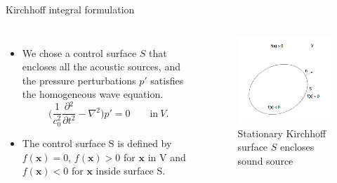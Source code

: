 \documentclass[10pt, aspectratio=169]{beamer}
\begin{document}
\begin{frame}{Kirchhoff integral formulation}
	\begin{columns}
		\begin{itemize}
			\item We chose a control surface $S$ that encloses all the acoustic sources, and the pressure perturbations $p'$ satisfies the homogeneous wave equation.
			\begin{equation}\label{Wave equation}
				\Bigg( \frac{1}{c_{0}^2}\frac{\partial{}^{2}}{\partial{t}^{2}}- \nabla{}^{2} \Bigg) p' = 0 \quad \quad \textrm{in} \ V.
			\end{equation}
			\item The control surface S is defined by $f(\mathbf{x}) = 0$, $f(\mathbf{x}) > 0$ for $\mathbf{x}$ in V and $f(\mathbf{x}) < 0$ for $\mathbf{x}$ inside surface S.
		\end{itemize}
				
		\begin{figure}[h]
			\includegraphics[scale = 0.3]{images/kirchhoff_surface.png}
			\caption{Stationary Kirchhoff surface $S$ encloses sound source}	
		\end{figure}
							
	\end{columns}
\end{frame}
\end{document}
